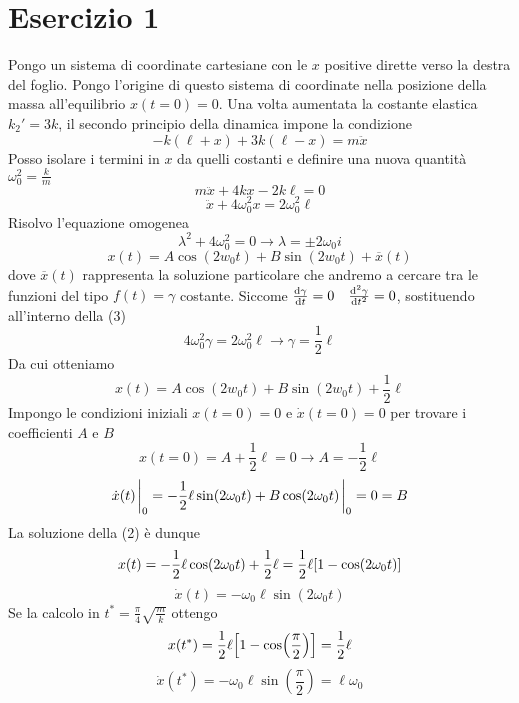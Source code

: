 \documentclass{scrartcl}
\begin{document}
\section*{Esercizio 1}
Pongo un sistema di coordinate cartesiane con le \(x\) positive dirette verso la destra del foglio.
Pongo l'origine di questo sistema di coordinate nella posizione della massa all'equilibrio \(x(t=0) = 0\).
Una volta aumentata la costante elastica \(k_2' = 3k\), il secondo principio della dinamica impone la condizione
\begin{equation}
    -k(\ell+x)+ 3k(\ell-x) = m \ddot{x}
\end{equation}
Posso isolare i termini in \(x\) da quelli costanti e definire una nuova quantità \(\omega_0^2 = \frac{k}{m}\)
\[
    m\ddot{x} + 4kx -2k\ell = 0
\]
\begin{equation}
    \ddot{x} + 4 \omega_0^2 x = 2 \omega_0^2\ell
\end{equation}
Risolvo l'equazione omogenea 
\[
    \lambda^2 +4\omega_0^2 = 0 \longrightarrow \lambda = \pm 2 \omega_0 i
\]
\begin{equation}
    x(t) = A\cos(2w_0t) + B\sin(2w_0t) + \overline{x}(t)
\end{equation}
dove \(\overline{x}(t)\) rappresenta la soluzione particolare che andremo a cercare tra le funzioni del tipo \(f(t) = \gamma\) costante.
Siccome \(\dv{\gamma}{t} = 0 \quad \dv[2]{\gamma}{t} = 0\), sostituendo all'interno della (3)
\[4\omega_0^2 \gamma = 2\omega_0^2 \ell \longrightarrow \gamma = \frac{1}{2}\ell\]
Da cui otteniamo
\begin{equation}
    x(t) = A\cos(2w_0t) + B\sin(2w_0t) + \frac{1}{2}\ell
\end{equation}
Impongo le condizioni iniziali \(x(t=0) = 0\) e \(\dot{x}(t=0) = 0\) per trovare i coefficienti \(A\) e \(B\)
\[x(t=0) = A +\frac{1}{2}\ell = 0 \longrightarrow A = - \frac{1}{2}\ell\]
\[\dot x(t)\eval_{0} = - \frac{1}{2}\ell \sin(2\omega_0 t) + B \cos(2\omega_0 t) \eval_{0} = 0 = B\]
La soluzione della (2) è dunque 
\begin{equation}
    x(t) = - \frac{1}{2}\ell \cos(2\omega_0 t) + \frac{1}{2} \ell = \frac{1}{2}\ell \qty[1-\cos(2\omega_0 t)]
\end{equation}
\[\dot x(t) = - \omega_0 \ell \sin(2\omega_0 t)\]
Se la calcolo in \(t^* = \frac{\pi}{4}\sqrt{\frac{m}{k}}\) ottengo
\begin{equation}
    x(t^*) = \frac{1}{2}\ell \qty[1-\cos(\frac{\pi}{2})] = \frac{1}{2}\ell
\end{equation}
\[\dot x(t^*) = -\omega_0 \ell \sin(\frac{\pi}{2}) = \ell \omega_0\]
\end{document}
